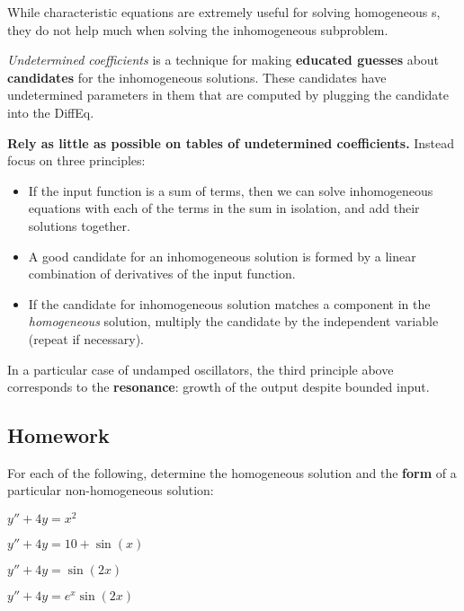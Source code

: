 \begin{weekintro}
  While characteristic equations are extremely useful for solving homogeneous \ode{}s, they do not help much when solving the inhomogeneous subproblem.

  \emph{Undetermined coefficients} is a technique for making \textbf{educated guesses} about \textbf{candidates} for the inhomogeneous solutions. These candidates have undetermined parameters in them that are computed by plugging the candidate into the DiffEq.

  \textbf{Rely as little as possible on tables of undetermined coefficients.} Instead focus on three principles:
  \begin{itemize}
  \item If the input function is a sum of terms, then we can solve inhomogeneous equations with each of the terms in the sum in isolation, and add their solutions together.
  \item A good candidate for an inhomogeneous solution is formed by a linear combination of derivatives of the input function.
  \item If the candidate for inhomogeneous solution matches a component in the \emph{homogeneous} solution, multiply the candidate by the independent variable (repeat if necessary).
  \end{itemize}

In a particular case of undamped oscillators, the third principle above corresponds to the \textbf{resonance}: growth of the output despite bounded input.
\end{weekintro}

\subsection*{Homework}

\begin{question}
  For each of the following, determine the homogeneous solution and the \textbf{form} of a particular non-homogeneous solution:
  \begin{fullwidth}
  \begin{colenumerate}[4]
  \item \(y'' + 4y = x^{2}\)
  \item \(y'' + 4y = 10 + \sin(x)\)
  \item \(y'' + 4y = \sin(2 x)\)
  \item \(y'' + 4y = e^{x}\sin(2 x)\)
\end{colenumerate}
  \solspace{1in}
\end{fullwidth}
\end{question}

